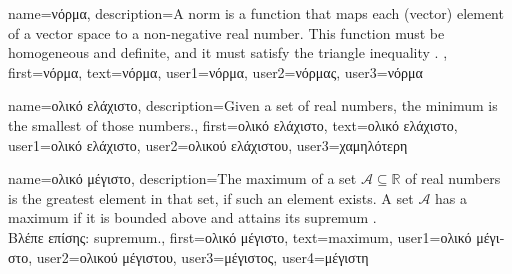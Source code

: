 {name={\foreignlanguage{greek}{νόρμα}},
	description={A norm is a function that maps each (vector) element 
		of a vector space to a non-negative real number. This function must be 
		homogeneous and definite, and it must satisfy the triangle inequality \cite{HornMatAnalysis}.  },
	first={\foreignlanguage{greek}{νόρμα}},
	text={\foreignlanguage{greek}{νόρμα}},
	user1={\foreignlanguage{greek}{νόρμα}}, %
    	user2={\foreignlanguage{greek}{νόρμας}}, %
	user3={\foreignlanguage{greek}{νόρμα}} %
}


{name={\foreignlanguage{greek}{ολικό ελάχιστο}},
	description={Given a set of real numbers, the minimum is the smallest of those numbers.},
	first={\foreignlanguage{greek}{ολικό ελάχιστο}},
	text={\foreignlanguage{greek}{ολικό ελάχιστο}},
	user1={\foreignlanguage{greek}{ολικό ελάχιστο}}, %
	user2={\foreignlanguage{greek}{ολικού ελάχιστου}}, %
	user3={\foreignlanguage{greek}{χαμηλότερη}} %
}

{name={\foreignlanguage{greek}{ολικό μέγιστο}},
     description={The maximum of a set $\mathcal{A} \subseteq \mathbb{R}$ 
     	of real numbers is the greatest element in that set, if such an element exists. A set $\mathcal{A}$ 
     	has a maximum if it is bounded above and attains its \gls{supremum} \cite[Sec.~1.4]{RudinBookPrinciplesMatheAnalysis}.\\
	\foreignlanguage{greek}{Βλέπε επίσης:} \gls{supremum}.},
 first={\foreignlanguage{greek}{ολικό μέγιστο}},
 text={maximum},
 user1={\foreignlanguage{greek}{ολικό μέγιστο}}, %
 user2={\foreignlanguage{greek}{ολικού μέγιστου}}, %
 user3={\foreignlanguage{greek}{μέγιστος}}, %
 user4={\foreignlanguage{greek}{μέγιστη}} %
}

